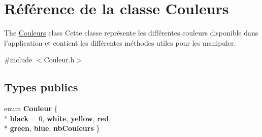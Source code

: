 \hypertarget{class_couleurs}{\section{Référence de la classe Couleurs}
\label{class_couleurs}
}


The \hyperlink{class_couleurs}{Couleurs} class Cette classe représente les différentes couleurs disponible dans l'application et contient les différentes méthodes utiles pour les manipuler.  




{\ttfamily \#include $<$Couleur.\+h$>$}

\subsection*{Types publics}
\begin{DoxyCompactItemize}
\item 
\hypertarget{class_couleurs_abd168094c41895357f4402e17bcd7379}{enum {\bfseries Couleur} \{ \\*
{\bfseries black} = 0, 
{\bfseries white}, 
{\bfseries yellow}, 
{\bfseries red}, 
\\*
{\bfseries green}, 
{\bfseries blue}, 
{\bfseries nb\+Couleurs}
 \}}\label{class_couleurs_abd168094c41895357f4402e17bcd7379}

\end{DoxyCompactItemize}
